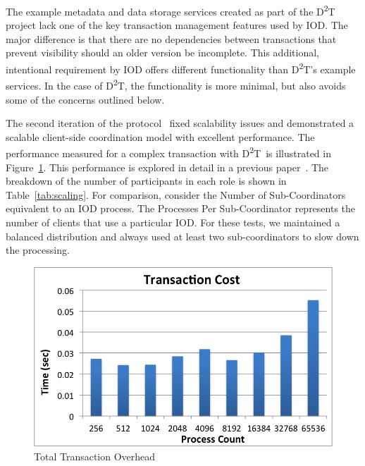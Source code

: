 \documentclass[conference]{sig-alt-gov2}
\newcommand{\DDT}{D\textsuperscript{2}T~}
\newcommand{\DDTns}{D\textsuperscript{2}T}
\begin{document}
The example metadata and data storage services created as part of the \DDT
project lack one of the key transaction management features used by IOD.
The major difference is that there are no dependencies between transactions
that prevent visibility should an older version be incomplete. This additional,
intentional requirement by IOD offers different functionality than \DDTns's
example services. In the case of \DDTns, the functionality is more minimal, but
also avoids some of the concerns outlined below.

The second iteration of the protocol~\cite{lofstead:2013:pdsw-txn} fixed
scalability issues and demonstrated a scalable client-side coordination model
with excellent performance. The performance measured for a complex transaction
with \DDT is illustrated in Figure~\ref{fig:performance}. This performance is
explored in detail in a previous paper~\cite{lofstead:2013:pdsw-txn}. The
breakdown of the number of participants in each role is shown in
Table~\ref{tab:scaling}. For comparison, consider the Number of
Sub-Coordinators equivalent to an IOD process. The Processes Per
Sub-Coordinator represents the number of clients that use a particular IOD. For
these tests, we maintained a balanced distribution and always used at least two
sub-coordinators to slow down the processing.

\begin{figure}[ht]
\centering
\includegraphics[keepaspectratio=true, width=0.9\columnwidth]{images/performance}
\vspace{-0.15in}
\caption{Total Transaction Overhead}
\label{fig:performance}
\vspace{-0.15in}
\end{figure}
\end{document}
